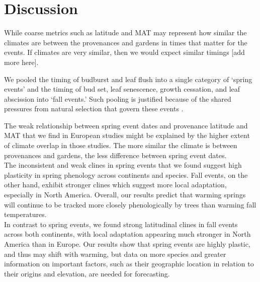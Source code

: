 \documentclass{article}
\begin{document}



\section{Discussion}
While coarse metrics such as latitude and MAT may represent how similar the climates are between the provenances and gardens in times that matter for the events. If climates are very similar, then we would expect similar timings [add more here].

We pooled the timing of budburst and leaf flush into a single category of ‘spring events’ and the timing of bud set, leaf senescence, growth cessation, and leaf abscission into ‘fall events.’ Such pooling is justified because of the shared pressures from natural selection that govern these events \citep{Gill15}. 

The weak relationship between spring event dates and provenance latitude and MAT that we find in European studies might be explained by the higher extent of climate overlap in those studies. The more similar the climate is between provenances and gardens, the less difference between spring event dates.
\\

The inconsistent and weak clines in spring events that we found suggest high plasticity in spring phenology across continents and species. Fall events, on the other hand, exhibit stronger clines which suggest more local adaptation, especially in North America. Overall, our results predict that warming springs will continue to be tracked more closely phenologically by trees than warming fall temperatures.
\\

In contrast to spring events, we found strong latitudinal clines in fall events across both continents, with local adaptation appearing much stronger in North America than in Europe. Our results show that spring events are highly plastic, and thus may shift with warming, but data on more species and greater information on important factors, such as their geographic location in relation to their origins and elevation, are needed for forecasting. 
\end{document}
